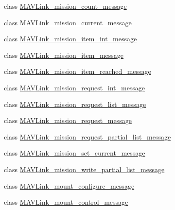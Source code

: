 \begin{DoxyCompactItemize}
\item 
class \hyperlink{classpymavlink_1_1dialects_1_1v10_1_1MAVLink__mission__count__message}{M\+A\+V\+Link\+\_\+mission\+\_\+count\+\_\+message}
\item 
class \hyperlink{classpymavlink_1_1dialects_1_1v10_1_1MAVLink__mission__current__message}{M\+A\+V\+Link\+\_\+mission\+\_\+current\+\_\+message}
\item 
class \hyperlink{classpymavlink_1_1dialects_1_1v10_1_1MAVLink__mission__item__int__message}{M\+A\+V\+Link\+\_\+mission\+\_\+item\+\_\+int\+\_\+message}
\item 
class \hyperlink{classpymavlink_1_1dialects_1_1v10_1_1MAVLink__mission__item__message}{M\+A\+V\+Link\+\_\+mission\+\_\+item\+\_\+message}
\item 
class \hyperlink{classpymavlink_1_1dialects_1_1v10_1_1MAVLink__mission__item__reached__message}{M\+A\+V\+Link\+\_\+mission\+\_\+item\+\_\+reached\+\_\+message}
\item 
class \hyperlink{classpymavlink_1_1dialects_1_1v10_1_1MAVLink__mission__request__int__message}{M\+A\+V\+Link\+\_\+mission\+\_\+request\+\_\+int\+\_\+message}
\item 
class \hyperlink{classpymavlink_1_1dialects_1_1v10_1_1MAVLink__mission__request__list__message}{M\+A\+V\+Link\+\_\+mission\+\_\+request\+\_\+list\+\_\+message}
\item 
class \hyperlink{classpymavlink_1_1dialects_1_1v10_1_1MAVLink__mission__request__message}{M\+A\+V\+Link\+\_\+mission\+\_\+request\+\_\+message}
\item 
class \hyperlink{classpymavlink_1_1dialects_1_1v10_1_1MAVLink__mission__request__partial__list__message}{M\+A\+V\+Link\+\_\+mission\+\_\+request\+\_\+partial\+\_\+list\+\_\+message}
\item 
class \hyperlink{classpymavlink_1_1dialects_1_1v10_1_1MAVLink__mission__set__current__message}{M\+A\+V\+Link\+\_\+mission\+\_\+set\+\_\+current\+\_\+message}
\item 
class \hyperlink{classpymavlink_1_1dialects_1_1v10_1_1MAVLink__mission__write__partial__list__message}{M\+A\+V\+Link\+\_\+mission\+\_\+write\+\_\+partial\+\_\+list\+\_\+message}
\item 
class \hyperlink{classpymavlink_1_1dialects_1_1v10_1_1MAVLink__mount__configure__message}{M\+A\+V\+Link\+\_\+mount\+\_\+configure\+\_\+message}
\item 
class \hyperlink{classpymavlink_1_1dialects_1_1v10_1_1MAVLink__mount__control__message}{M\+A\+V\+Link\+\_\+mount\+\_\+control\+\_\+message}

\end{DoxyCompactItemize}
